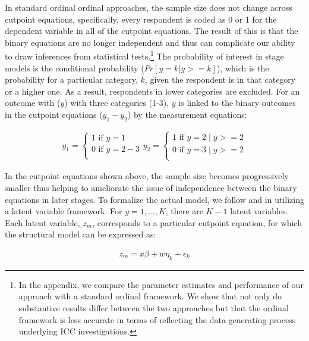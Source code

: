 In standard ordinal ordinal approaches, the sample size does not change across cutpoint equations, specifically, every respondent is coded as 0 or 1 for the dependent variable in all of the cutpoint equations. The result of this is that the binary equations are no longer independent and thus can complicate our ability to draw inferences from statistical tests.\footnote{In the appendix, we compare the parameter estimates and performance of our approach with a standard ordinal framework. We show that not only do substantive results differ between the two approaches but that the ordinal framework is less accurate in terms of reflecting the data generating process underlying ICC investigations.} The probability of interest in stage models is the conditional probability ($Pr[ y = k | y >= k]$), which is the probability for a particular category, $k$, given the respondent is in that category or a higher one. As a result, respondents in lower categories are excluded. For an outcome with ($y$) with three categories (1-3), $y$ is linked to the binary outcomes in the cutpoint equations ($y_{1} - y_{2}$) by the measurement equations:

\begin{eqnarray}
	y_{1} =
	\begin{cases}
		1 \text{ if } y = 1 \nonumber \\
		0 \text{ if } y = 2-3 \nonumber \\
	\end{cases}
	y_{2} =
	\begin{cases}
		1 \text{ if } y = 2 \; | \; y >= 2 \nonumber \\
		0 \text{ if } y = 3 \; | \; y >= 2 \nonumber \\
	\end{cases}
\end{eqnarray}

In the cutpoint equations shown above, the sample size becomes progressively smaller thus helping to ameliorate the issue of independence between the binary equations in later stages. To formalize the actual model, we follow \citet{tutz1990sequential} and \citet{agresti:2010} in utilizing a latent variable framework. For $y=1,\ldots,K$, there are $K-1$ latent variables. Each latent variable, $z_{m}$, corresponds to a particular cutpoint equation, for which the structural model can be expressed as:

\begin{align}
	z_{m} = x \beta + w\eta_{k}  + \epsilon_{k}
\end{align}

